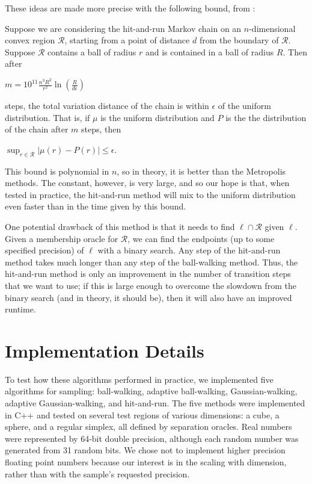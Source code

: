 \documentclass[11pt]{article}
\begin{document}
These ideas are made more precise with the following bound, from \cite{Vempala}:

\begin{theorem} \label{hitandrunbound} Suppose we are considering the hit-and-run Markov chain on an $n$-dimensional convex region $\mathcal{R}$, starting from a point of distance $d$ from the boundary of $\mathcal{R}$. Suppose $\mathcal{R}$ contains a ball of radius $r$ and is contained in a ball of radius $R$. Then after
\begin{center}$m = \displaystyle 10^{11}\frac{ n^3 R^2}{r^2}\ln\left(\frac{R}{d\epsilon}\right)$\end{center}
steps, the total variation distance of the chain is within $\epsilon$ of the uniform distribution. That is, if $\mu$ is the uniform distribution and $P$ is the the distribution of the chain after $m$ steps, then
\begin{center}$\displaystyle \sup_{r \in \mathcal{R}} |\mu(r) - P(r)| \le \epsilon$.\end{center}
\end{theorem}

This bound is polynomial in $n$, so in theory, it is better than the Metropolis methods. The constant, however, is very large, and so our hope is that, when tested in practice, the hit-and-run method will mix to the uniform distribution even faster than in the time given by this bound.

One potential drawback of this method is that it needs to find $\ell \cap \mathcal{R}$ given $\ell$. Given a membership oracle for $\mathcal{R}$, we can find the endpoints (up to some specified precision) of $\ell$ with a binary search. Any step of the hit-and-run method takes much longer than any step of the ball-walking method. Thus, the hit-and-run method is only an improvement in the number of transition steps that we want to use; if this is large enough to overcome the slowdown from the binary search (and in theory, it should be), then it will also have an improved runtime.

\section{Implementation Details}

To test how these algorithms performed in practice, we implemented five algorithms for sampling: ball-walking, adaptive ball-walking, Gaussian-walking, adaptive Gaussian-walking, and hit-and-run. The five methods were implemented in C++ and tested on several test regions of various dimensions: a cube, a sphere, and a regular simplex, all defined by separation oracles. Real numbers were represented by 64-bit double precision, although each random number was generated from 31 random bits. We chose not to implement higher precision floating point numbers because our interest is in the scaling with dimension, rather than with the sample's requested precision.
\end{document}
